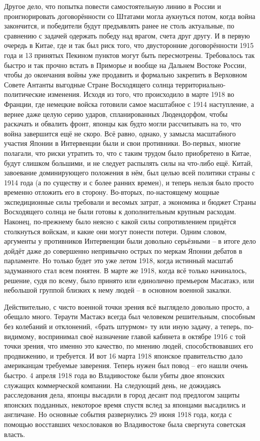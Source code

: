 Другое дело, что попытка повести самостоятельную линию в России и проигнорировать договорённости со Штатами могла аукнуться потом, когда война закончится, и победители будут предъявлять ранее не столь актуальные, по сравнению с задачей одержать победу над врагом, счета друг другу. И в первую очередь в Китае, где и так был риск того, что двусторонние договорённости 1915 года и 13 принятых Пекином пунктов могут быть пересмотрены. Требовалось так быстро и так прочно встать в Приморье и вообще на Дальнем Востоке России, чтобы до окончания войны уже продавить и формально закрепить в Верховном Совете Антанты выгодные Стране Восходящего солнца территориально-политические изменения. Исходя из того, что происходило в марте 1918 во Франции, где немецкие войска готовили самое масштабное с 1914 наступление, а вернее даже целую серию ударов, спланированных Людендорфом, чтобы раскачать и обвалить фронт, японцы как будто могли рассчитывать на то, что война завершится ещё не скоро. Всё равно, однако, у замысла масштабного участия Японии в Интервенции были и свои противники. Во-первых, многие полагали, что риски утратить то, что с таким трудом было приобретено в Китае, будут слишком большими, и не следует распылять силы на что-либо ещё. Китай, завоевание доминирующего положения в нём, был целью всей политики страны с 1914 года (а по существу и с более ранних времен), и теперь нельзя было просто временно отложить его в сторону. Во-вторых, по-настоящему мощные экспедиционные силы требовали и весомых затрат, а экономика и бюджет Страны Восходящего солнца не были готовы к дополнительным крупным расходам. Наконец, по-прежнему было неясно с какой силы сопротивлением придётся столкнуться войскам, и какие они могут понести потери. Одним словом, аргументы у противников Интервенции были довольно серьёзными – в итоге дело дойдёт даже до совершенно непривычно острых по меркам Японии дебатов в парламенте. Но только будет это уже летом 1918, когда истинный масштаб задуманного стал всем понятен. В марте же 1918, когда всё только начиналось, решение, судя по всему, было принято или единолично премьером Масатакэ, или небольшой группой близких к нему людей – в основном военной закалки.

Действительно, с чисто военной точки зрения всё выглядело довольно просто, а обещало много. Тераути Мастакэ всегда был человеком решительным, способным без колебаний и отклонений, «брать штурмом» ту или иную задачу, а теперь, по-видимому, воспринимал своё назначение главой кабинета в октябре 1916 с той точки зрения, что именно это качество, по мнению людей, способствовавших его продвижению, и требуется. И вот 16 марта 1918 японское правительство дало американцам требуемые заверения. Теперь нужен был повод – его нашли очень быстро. 4 апреля 1918 года во Владивостоке были убиты двое японских служащих коммерческой компании. На следующий день, не дожидаясь расследования дела, японцы высадили в город десант под предлогом защиты японских подданных, некоторое время спустя вслед за японцами высадились и англичане. Но основные события развернулись 29 июня 1918 года, когда с помощью восставших чехословаков во Владивостоке была свергнута советская власть.

